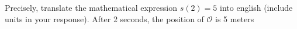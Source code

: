 {Precisely, translate the mathematical expression $s(2)=5$ into english (include units in your response).}
{After 2 seconds, the position of $\mathcal{O}$ is 5 meters}